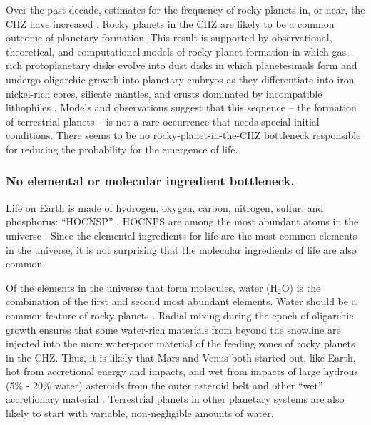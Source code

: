Over the past decade, estimates for the frequency of rocky planets in, or near, the CHZ have increased \citep{Howard2012,Lineweaver2012AnnRev,Petigura2013,Bovaird2013,Fressin2013,Marcy2014,Bovaird2015,Burke2015}.
Rocky planets in the CHZ are likely to be a common outcome of planetary formation.
This result is supported by observational, theoretical, and computational models of rocky planet formation in which gas-rich protoplanetary disks evolve into dust disks
in which planetesimals form and undergo oligarchic growth into planetary embryos as they
differentiate into iron-nickel-rich cores, silicate mantles, and crusts dominated by incompatible lithophiles \citep{Morbidelli2012,Elkins-Tanton2012,Chambers2014,Hardy2015}. Models and observations suggest that this sequence -- the formation of terrestrial planets -- is not a rare occurrence that needs special initial conditions. There seems to be no rocky-planet-in-the-CHZ bottleneck responsible for reducing the probability for the emergence of life.

\subsubsection{No elemental or molecular ingredient bottleneck.}

Life on Earth is made of hydrogen, oxygen, carbon, nitrogen, sulfur, and phosphorus: ``HOCNSP'' \citep{Chopra2010}. HOCNPS are among the most abundant atoms in the universe \citep{Pace2001,Lodders2009a,Lineweaver2012}. Since the elemental ingredients for life are the most common elements in the universe, it is not surprising that the molecular ingredients of life are also common.

Of the elements in the universe that form molecules, water (H$_{2}$O) is the combination of the first and second most abundant elements. 
Water should be a common feature of rocky planets \citep{Raymond2004,Raymond2007,Elkins-Tanton2012}.
Radial mixing during the epoch of oligarchic growth ensures that some water-rich materials from beyond the snowline are injected into the more water-poor material
of the feeding zones of rocky planets in the CHZ.
Thus, it is likely that Mars and Venus both started out, like Earth, hot from accretional energy and impacts, and wet from impacts of large
hydrous (5\% - 20\% water) asteroids from the outer asteroid belt \citep{Morbidelli2000,Morbidelli2012} and other ``wet'' accretionary material \citep{Drake2002,Drake2005}.
Terrestrial planets in other planetary systems are also likely to start with variable, non-negligible amounts of water.

